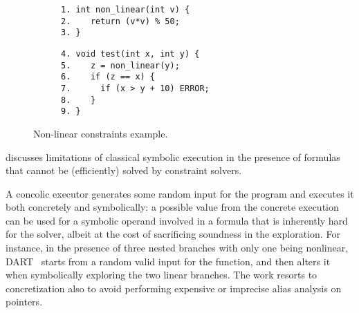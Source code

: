 \begin{figure}[t]
  \begin{center}
  \begin{subfigure}{.4\textwidth}
    \vspace{0mm}
    \begin{lstlisting}[basicstyle=\ttfamily\scriptsize]
1. int non_linear(int v) {
2.    return (v*v) % 50;
3. }
    \end{lstlisting}
    \vspace{8.5mm}
  \end{subfigure}%
    \begin{subfigure}{.4\textwidth}
    \begin{lstlisting}[basicstyle=\ttfamily\scriptsize]
4. void test(int x, int y) {
5.    z = non_linear(y);
6.    if (z == x) {
7.      if (x > y + 10) ERROR;  
8.    }
9. }
    \end{lstlisting}
  \end{subfigure}%
  \end{center}
  \vspace{-3.5mm}
  \caption{Non-linear constraints example.}
  \label{fi:non-linear-constraints}
\end{figure}


\cite{CS-CACM13} discusses limitations of classical symbolic execution in the presence of formulas that cannot be (efficiently) solved by constraint solvers. 


\noindent A concolic executor generates some random input for the program and executes it both concretely and symbolically: a possible value from the concrete execution can be used for a symbolic operand involved in a formula that is inherently hard for the solver, albeit at the cost of sacrificing soundness in the exploration. For instance, in the presence of three nested branches with only one being nonlinear, {\sc DART}~\cite{DART-PLDI05} starts from a random valid input for the function, and then alters it when symbolically exploring the two linear branches. The work resorts to concretization also to avoid performing expensive or imprecise alias analysis on pointers. %

